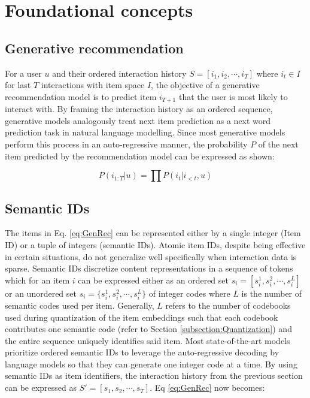 \documentclass[11pt,a4paper]{article}
\begin{document}
\section{Foundational concepts}
\subsection{Generative recommendation}
For a user $u$ and their ordered interaction history $S = [i_1, i_2, \cdots, i_T]$ where $i_t \in I$ for last $T$ interactions with item space $I$, the objective of a generative recommendation model is to predict item $i_{T+1}$ that the user is most likely to interact with. By framing the interaction history as an ordered sequence, generative models analogously treat next item prediction as a next word prediction task in natural language modelling. Since most generative models perform this process in an auto-regressive manner, the probability $P$ of the next item predicted by the recommendation model can be expressed as shown:

\begin{equation} \label{eq:GenRec}
P (i_{1:T} | u) = \prod P(i_t | i_{<t}, u)
\end{equation}

\subsection{Semantic IDs}
The items in Eq. \ref{eq:GenRec} can be represented either by a single integer (Item ID) or a tuple of integers (semantic IDs). Atomic item IDs, despite being effective in certain situations, do not generalize well specifically when interaction data is sparse. Semantic IDs discretize content representations in a sequence of tokens which for an item $i$ can be expressed either as an ordered set $s_i = [s^1_i, s^2_i, \cdots, s^L_i]$ or an unordered set $s_i = \{s^1_i, s^2_i, \cdots, s^L_i\}$  of integer codes where $L$ is the number of semantic codes used per item. Generally, $L$ refers to the number of codebooks used during quantization of the item embeddings such that each codebook contributes one semantic code (refer to Section \ref{subsection:Quantization}) and the entire sequence uniquely identifies said item. Most state-of-the-art models prioritize ordered semantic IDs to leverage the auto-regressive decoding by language models so that they can generate one integer code at a time. By using semantic IDs as item identifiers, the interaction history from the previous section can be expressed as $S' = [s_1, s_2, \cdots, s_T]$. Eq \ref{eq:GenRec} now becomes:
\end{document}
